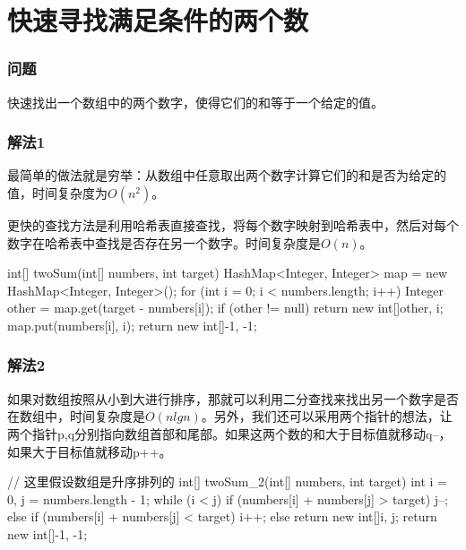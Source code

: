\section{快速寻找满足条件的两个数} %
\label{sec:two-sum}

\subsubsection{问题}
快速找出一个数组中的两个数字，使得它们的和等于一个给定的值。

\subsubsection{解法1}
最简单的做法就是穷举：从数组中任意取出两个数字计算它们的和是否为给定的值，时间复杂度为$O(n^2)$。

更快的查找方法是利用哈希表直接查找，将每个数字映射到哈希表中，然后对每个数字在哈希表中查找是否存在另一个数字。时间复杂度是$O(n)$。

\begin{Codex}[label={[$O(n)+O(n)$]Chap02_12_TwoSum.java}]
int[] twoSum(int[] numbers, int target) {
    HashMap<Integer, Integer> map = new HashMap<Integer, Integer>();
    for (int i = 0; i < numbers.length; i++) {
        Integer other = map.get(target - numbers[i]);
        if (other != null) {
            return new int[]{other, i};
        }
        map.put(numbers[i], i);
    }
    return new int[]{-1, -1};
}
\end{Codex}

\subsubsection{解法2}
如果对数组按照从小到大进行排序，那就可以利用二分查找来找出另一个数字是否在数组中，时间复杂度是$O(nlgn)$。另外，我们还可以采用两个指针的想法，让两个指针p,q分别指向数组首部和尾部。如果这两个数的和大于目标值就移动q--，
如果大于目标值就移动p++。

\begin{Codex}[label={[$O(n)+O(1)$]Chap02_12_TwoSum.java}]
// 这里假设数组是升序排列的
int[] twoSum_2(int[] numbers, int target) {
    int i = 0, j = numbers.length - 1;
    while (i < j) {
        if (numbers[i] + numbers[j] > target) {
            j--;
        } else if (numbers[i] + numbers[j] < target) {
            i++;
        } else {
            return new int[]{i, j};
        }
    }
    return new int[]{-1, -1};
}
\end{Codex}


